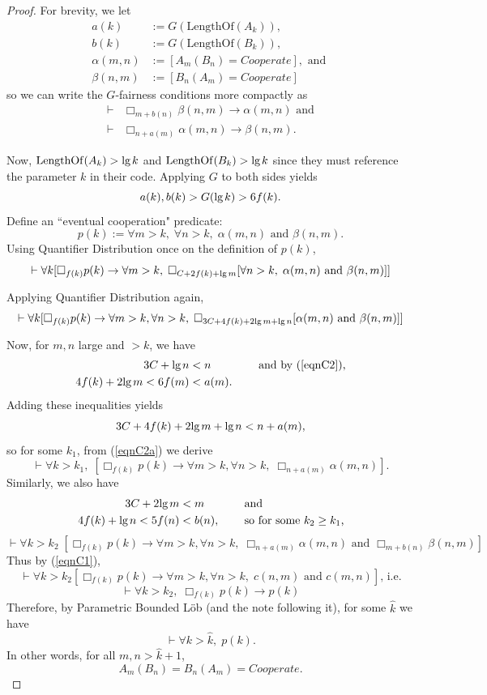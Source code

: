 \documentclass[onecolumn,authordate]{miri-tech-article}
\numberwithin{equation}{section}
\newcommand{\eqn}[1]{\begin{equation}#1\end{equation}}
\theoremstyle{definition}
\newcommand{\proves}[1]{\underset{#1}{\vdash}}
\newcommand{\bx}[1]{\Box_{#1}}
\renewcommand{\implies}{\rightarrow}
\newcommand{\AND}{{\textrm{ and }}}
\renewcommand{\lg}{\mathrm{lg\hspace{0.3ex}}}
\renewcommand{\-}{^{-1}}
\begin{document}
\begin{proof}
For brevity, we let
\begin{align}
a(k) &:= G(\mathrm{LengthOf}(A_k)), \\
b(k) &:= G(\mathrm{LengthOf}(B_k)), \\
\alpha(m,n) &:= [A_m(B_n) = Cooperate], \text{ and }\\
\beta(n,m) &:= [B_n(A_m) = Cooperate]
\end{align}
so we can write the $G$-fairness conditions more compactly as
\begin{align}
\label{eqnC1}     \proves{} &\bx{m+b(n)} \beta(n,m) \implies \alpha(m,n) \text{ and}\\
\nonumber    \proves{} &\bx{n+a(m)} \alpha(m,n) \implies \beta(n,m).
\end{align}


Now, $\mathrm{LengthOf}(A_k) > \lg k$ and $\mathrm{LengthOf}(B_k) > \lg k$ since they must reference the parameter $k$ in their code.  Applying $G$ to both sides yields
\eqn{\label{eqnC2} a(k),b(k) > G(\lg k) > 6f(k).}
Define an ``eventual cooperation" predicate:
$$p(k) := \forall m> k,\; \forall n> k, \; \alpha(m,n) \AND \beta(n,m).$$
Using Quantifier Distribution once on the definition of $p(k)$,
$$\proves{} \forall k [\bx{f(k)}p(k) \implies \forall m>k, \; \bx{C+2f(k)+\lg m } [\forall n > k, \; \alpha(m,n) \AND \beta(n,m)]]$$
Applying Quantifier Distribution again,
\eqn{\label{eqnC2a}\proves{} \forall k [\bx{f(k)}p(k) \implies \forall m>k, \forall n > k, \;  \bx{3C+4f(k)+2\lg m +\lg n }[\alpha(m,n) \AND \beta(n,m)]]}
Now, for $m,n$ large and $>k$, we have
\begin{align*}
3C + \lg n  &< n &&\textrm{ \quad and by (\ref{eqnC2}),}\\
4f(k) + 2\lg m  < 6f(m) &< a(m). &&
\end{align*}
Adding these inequalities yields
$$3C+4f(k)+2\lg m +\lg n < n+a(m),$$
so for some $k_1$, from (\ref{eqnC2a}) we derive
$$\proves{} \forall k>k_1,\; [\bx{f(k)}p(k) \implies \forall m>k, \forall n > k, \;  \bx{n+a(m)}\alpha(m,n)].$$
Similarly, we also have
\begin{align*}
3C + 2\lg m  &< m &&\textrm{ \quad and }\\
4f(k) + \lg n  < 5f(n) &< b(n), &&\text{ \quad so for some $k_2\geq k_1$,}
\end{align*}
$$\proves{} \forall k>k_2 \; [\bx{f(k)}p(k) \implies \forall m>k, \forall n > k, \;  \bx{n+a(m)}\alpha(m,n) \AND \bx{m+b(n)}\beta(n,m)]$$
Thus by (\ref{eqnC1}),
$$\proves{} \forall k > k_2 [\bx{f(k)}p(k) \implies \forall m>k, \forall n > k, \;  c(n,m) \AND c(m,n)]\text{, i.e.}$$
$$\proves{} \forall k > k_2, \; \bx{f(k)}p(k) \implies p(k)$$
Therefore, by Parametric Bounded L\"{o}b (and the note following it), for some $\hat k$ we have
$$\proves{} \forall k > \hat k, \; p(k).$$
In other words, for all $m,n>\hat k + 1$, 
$$A_m(B_n)=B_n(A_m)=Cooperate.$$
\end{proof}
\end{document}
